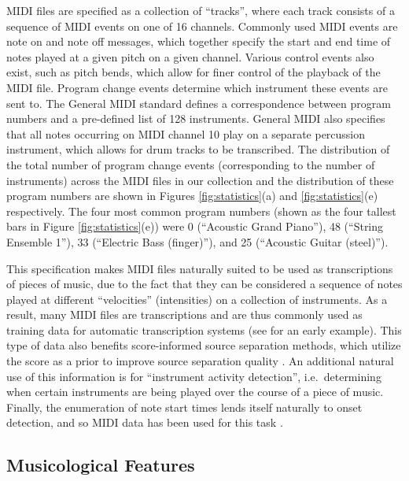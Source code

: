 \documentclass{article}
\begin{document}
MIDI files are specified as a collection of ``tracks'', where each track consists of a sequence of MIDI events on one of 16 channels.
Commonly used MIDI events are note on and note off messages, which together specify the start and end time of notes played at a given pitch on a given channel.
Various control events also exist, such as pitch bends, which allow for finer control of the playback of the MIDI file.
Program change events determine which instrument these events are sent to.
The General MIDI standard defines a correspondence between program numbers and a pre-defined list of 128 instruments.
General MIDI also specifies that all notes occurring on MIDI channel 10 play on a separate percussion instrument, which allows for drum tracks to be transcribed.
The distribution of the total number of program change events (corresponding to the number of instruments) across the MIDI files in our collection and the distribution of these program numbers are shown in Figures \ref{fig:statistics}(a) and \ref{fig:statistics}(e) respectively.
The four most common program numbers (shown as the four tallest bars in Figure \ref{fig:statistics}(e)) were 0 (``Acoustic Grand Piano''), 48 (``String Ensemble 1''), 33 (``Electric Bass (finger)''), and 25 (``Acoustic Guitar (steel)'').

This specification makes MIDI files naturally suited to be used as transcriptions of pieces of music, due to the fact that they can be considered a sequence of notes played at different ``velocities'' (intensities) on a collection of instruments.
As a result, many MIDI files are transcriptions and are thus commonly used as training data for automatic transcription systems (see \cite{turetsky2003ground} for an early example).
This type of data also benefits score-informed source separation methods, which utilize the score as a prior to improve source separation quality \cite{ewert2014score}.
An additional natural use of this information is for ``instrument activity detection'', i.e.\ determining when certain instruments are being played over the course of a piece of music.
Finally, the enumeration of note start times lends itself naturally to onset detection, and so MIDI data has been used for this task \cite{bello2005tutorial}.

\subsection{Musicological Features}
\end{document}
